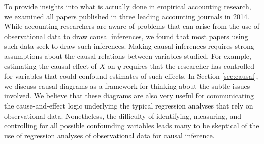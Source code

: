 \documentclass[12pt,reqno,titlepage]{amsart}
\begin{document}
\begin{doublespace}
To provide insights into what is actually done in empirical accounting research, we examined all papers published in three leading accounting journals in 2014. 
% 
While accounting researchers are aware of problems that can arise from the use of observational data to draw causal inferences, we found that most papers using such data seek to draw such inferences. 
Making causal inferences requires strong assumptions about the causal relations between variables studied.
For example, estimating the causal effect of $X$ on $y$ requires that the researcher has controlled for variables that could confound estimates of such effects.
In Section \ref{sec:causal}, we discuss causal diagrams as a framework for thinking about the subtle issues involved.
We believe that these diagrams are also very useful for communicating the cause-and-effect logic underlying the typical regression analyses that rely on observational data.
Nonetheless, the difficulty of identifying, measuring, and controlling for all possible confounding variables leads many to be skeptical of the use of regression analyses of observational data for causal inference.


\end{doublespace}
\end{document}
